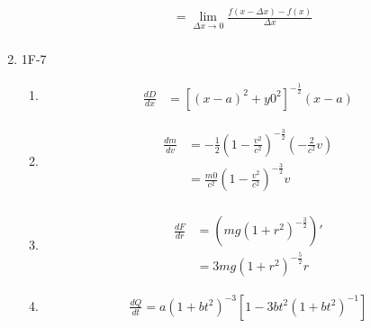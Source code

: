 \documentclass{article}
\begin{document}
\begin{enumerate}
\begin{align*}
                &= \lim_{\Delta x \to 0} \frac{f(x-\Delta x) - f(x)}{\Delta x} \\
    \end{align*}
\item 1F-7
    \begin{enumerate}
        \item 
            \begin{align*}
                \frac{dD}{dx} &= [(x-a)^2+y0^2]^{-\frac{1}{2}}(x-a)
            \end{align*}
        \item 
        \begin{align*}
            \frac{dm}{dv} 
            &= -\frac{1}{2}(1-\frac{v^2}{c^2})^{-\frac{3}{2}}(-\frac{2}{c^2}v) \\
            &= \frac{m0}{c^2}(1-\frac{v^2}{c^2})^{-\frac{3}{2}}v \\
        \end{align*}    
        \item
            \begin{align*}
                \frac{dF}{dr} &= (mg(1+r^2)^{-\frac{3}{2}})' \\
                &= 3mg(1+r^2)^{-\frac{5}{2}}r
            \end{align*}
        \item
            \begin{align*}
                \frac{dQ}{dt} = a(1+bt^2)^{-3}[1-3bt^2(1+bt^2)^{-1}]
            \end{align*}    
    \end{enumerate}
\end{enumerate}
\end{document}

